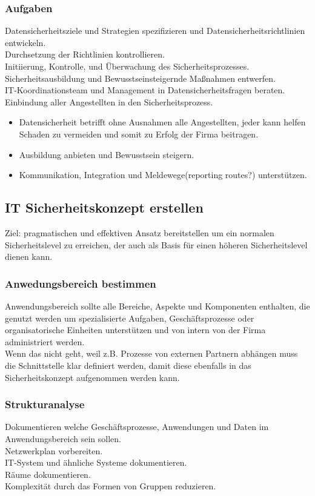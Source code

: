 \documentclass{article} %
\begin{document}
\subsubsection{Aufgaben}
Datensicherheitsziele und Strategien spezifizieren und Datensicherheitsrichtlinien entwickeln.\\
Durchsetzung der Richtlinien kontrollieren.\\
Initiierung, Kontrolle, und Überwachung des Sicherheitsprozesses.\\
Sicherheitsausbildung und Bewusstseinsteigernde Maßnahmen entwerfen.\\
IT-Koordinationsteam und Management in Datensicherheitsfragen beraten.
Einbindung aller Angestellten in den Sicherheitsprozess.
\begin{itemize}
	\item Datensicherheit betrifft ohne Ausnahmen alle Angestellten, jeder kann helfen Schaden zu vermeiden und somit zu Erfolg der Firma beitragen.
    \item Ausbildung anbieten und Bewusstsein steigern.
    \item Kommunikation, Integration und Meldewege(reporting routes?) unterstützen.
\end{itemize}
\subsection{IT Sicherheitskonzept erstellen}
Ziel: pragmatischen und effektiven Ansatz bereitstellen um ein normalen Sicherheitslevel zu erreichen, der auch als Basis für einen höheren Sicherheitslevel dienen kann.\\
\subsubsection{Anwedungsbereich bestimmen}
Anwendungsbereich sollte alle Bereiche, Aspekte und Komponenten enthalten, die genutzt werden um spezialisierte Aufgaben, Geschäftsprozesse oder organisatorische Einheiten unterstützen und von intern von der Firma administriert werden.\\
Wenn das nicht geht, weil z.B. Prozesse von externen Partnern abhängen muss die Schnittstelle klar definiert werden, damit diese ebenfalls in das Sicherheitskonzept aufgenommen werden kann.
\subsubsection{Strukturanalyse}
Dokumentieren welche Geschäftsprozesse, Anwendungen und Daten im Anwendungsbereich sein sollen.\\
Netzwerkplan vorbereiten.\\
IT-System und ähnliche Systeme dokumentieren.\\
Räume dokumentieren.\\
Komplexität durch das Formen von Gruppen reduzieren.
\end{document}
